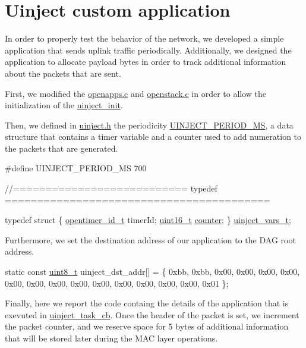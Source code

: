  \hypertarget{_l_k_n_contribution_Uinject_application}{}\section{Uinject custom application}\label{_l_k_n_contribution_Uinject_application}
In order to properly test the behavior of the network, we developed a simple application that sends uplink traffic periodically. Additionally, we designed the application to allocate payload bytes in order to track additional information about the packets that are sent.

First, we modified the \hyperlink{openapps_8c}{openapps.\+c} and \hyperlink{openstack_8c}{openstack.\+c} in order to allow the initialization of the \hyperlink{group__uinject_gac6dcaebf6fba84d30d183c304c65040e}{uinject\+\_\+init}.

Then, we defined in \hyperlink{uinject_8h}{uinject.\+h} the periodicity \hyperlink{group__uinject_ga5b31a0d33a0be3a28d77fbdba9a3e2b7}{U\+I\+N\+J\+E\+C\+T\+\_\+\+P\+E\+R\+I\+O\+D\+\_\+\+MS}, a data structure that contains a timer variable and a counter used to add numeration to the packets that are generated.


\begin{DoxyCodeInclude}
\textcolor{preprocessor}{#define UINJECT\_PERIOD\_MS 700}

\textcolor{comment}{//=========================== typedef =========================================}

\textcolor{keyword}{typedef} \textcolor{keyword}{struct }\{
   \hyperlink{group___open_timers_gae5ca9e65d270cdfa4bc74008d96d69ab}{opentimer\_id\_t}       timerId;  
   \hyperlink{_p_e___types_8h_a1f1825b69244eb3ad2c7165ddc99c956}{uint16\_t}             \hyperlink{boards_2eldorado_2radio_8c_a0480b812cba9c1d9c71a5fb1071bd0fc}{counter};  
\} \hyperlink{structuinject__vars__t}{uinject\_vars\_t};

\end{DoxyCodeInclude}
 Furthermore, we set the destination address of our application to the D\+AG root address.


\begin{DoxyCodeInclude}
\textcolor{keyword}{static} \textcolor{keyword}{const} \hyperlink{_p_e___types_8h_aba7bc1797add20fe3efdf37ced1182c5}{uint8\_t} uinject\_dst\_addr[]   = \{
   0xbb, 0xbb, 0x00, 0x00, 0x00, 0x00, 0x00, 0x00,
   0x00, 0x00, 0x00, 0x00, 0x00, 0x00, 0x00, 0x01
\};
\end{DoxyCodeInclude}
 Finally, here we report the code containg the details of the application that is exevuted in \hyperlink{uinject_8c_a59951fd503ef80b9526ba1eaaf952d9b}{uinject\+\_\+task\+\_\+cb}. Once the header of the packet is set, we increment the packet counter, and we reserve space for 5 bytes of additional information that will be stored later during the M\+AC layer operations.


